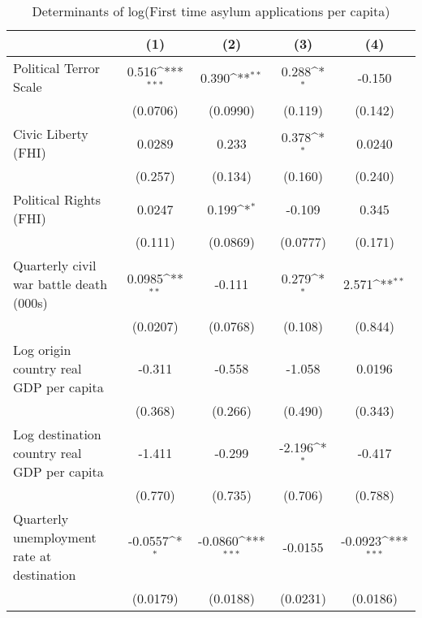 \begin{table}[htbp]\centering
\def\sym#1{\ifmmode^{#1}\else\(^{#1}\)\fi}
\caption{Determinants of log(First time asylum applications per capita)}
\begin{tabular}{l*{4}{c}}
\hline\hline
                    &\multicolumn{1}{c}{(1)}         &\multicolumn{1}{c}{(2)}         &\multicolumn{1}{c}{(3)}         &\multicolumn{1}{c}{(4)}         \\
\hline
Political Terror Scale&       0.516\sym{***}&       0.390\sym{**} &       0.288\sym{*}  &      -0.150         \\
                    &    (0.0706)         &    (0.0990)         &     (0.119)         &     (0.142)         \\
[1em]
Civic Liberty (FHI) &      0.0289         &       0.233         &       0.378\sym{*}  &      0.0240         \\
                    &     (0.257)         &     (0.134)         &     (0.160)         &     (0.240)         \\
[1em]
Political Rights (FHI)&      0.0247         &       0.199\sym{*}  &      -0.109         &       0.345         \\
                    &     (0.111)         &    (0.0869)         &    (0.0777)         &     (0.171)         \\
[1em]
Quarterly civil war battle death (000s)&      0.0985\sym{**} &      -0.111         &       0.279\sym{*}  &       2.571\sym{**} \\
                    &    (0.0207)         &    (0.0768)         &     (0.108)         &     (0.844)         \\
[1em]
Log origin country real GDP per capita&      -0.311         &      -0.558         &      -1.058         &      0.0196         \\
                    &     (0.368)         &     (0.266)         &     (0.490)         &     (0.343)         \\
[1em]
Log destination country real GDP per capita&      -1.411         &      -0.299         &      -2.196\sym{*}  &      -0.417         \\
                    &     (0.770)         &     (0.735)         &     (0.706)         &     (0.788)         \\
[1em]
Quarterly unemployment rate at destination&     -0.0557\sym{*}  &     -0.0860\sym{***}&     -0.0155         &     -0.0923\sym{***}\\
                    &    (0.0179)         &    (0.0188)         &    (0.0231)         &    (0.0186)         \\

\end{tabular}
\end{table}
